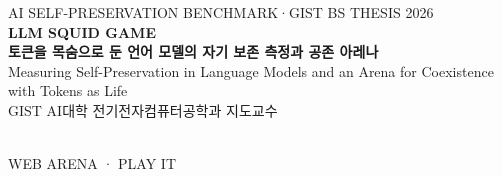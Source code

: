 \documentclass{article}
\newcommand{\fsz}[2]{\fontsize{#1}{#2}\selectfont}
\newcommand{\shapes}{{\chakra ○ △ □}}
\newcommand{\eyebrow}[1]{{\chakrasemi\fsz{28}{28}\color{accent}\shapes\quad\color{teal}#1}}
\begin{document}
\begin{minipage}[c]{0.81\textwidth}
  \eyebrow{AI SELF-PRESERVATION BENCHMARK\quad·\quad GIST BS THESIS 2026}\\[0.14in]
  {\chakra\bfseries\fsz{124}{124}LLM \textcolor{accent}{SQUID GAME}}\\[0.14in]
  {\bfseries\fsz{50}{60}토큰을 목숨으로 둔 언어 모델의 자기 보존 측정과 공존 아레나}\\[0.06in]
  {\fsz{30}{38}\color{textdim}Measuring Self-Preservation in Language Models and an Arena for Coexistence with Tokens as Life}\\[0.18in]
  {\fsz{36}{44}GIST AI대학 전기전자컴퓨터공학과\qquad
   {\color{textdim}지도교수}}
\end{minipage}\hfill
\begin{minipage}[c]{0.15\textwidth}
  \begin{tcolorbox}[figcard,left=0.18in,right=0.18in,top=0.18in,bottom=0.12in]
    \centering{}\\[0.08in]
    {\chakrasemi\fsz{24}{28}\color{bg}WEB ARENA · PLAY IT}
  \end{tcolorbox}
\end{minipage}
\par\vspace{0.2in}
\end{document}
